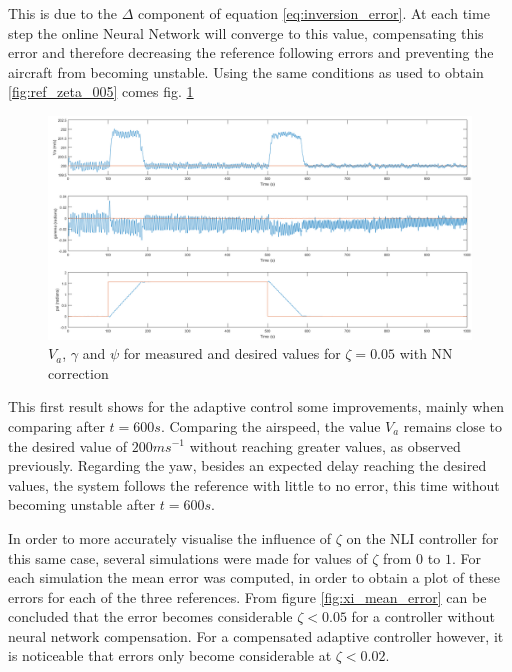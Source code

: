This is due to the $\Delta$ component of equation \ref{eq:inversion_error}. At each time step the online Neural Network will converge to this value, compensating this error and therefore decreasing the reference following errors and preventing the aircraft from becoming unstable. Using the same conditions as used to obtain \ref{fig:ref_zeta_005} comes fig. \ref{fig:ref_zeta_005_NN}

\begin{figure}[H]
\centering
\includegraphics[width=1.1\textwidth]{Figures/Results/ref_zeta_005_NN.png}
\caption[Reference tracking for $\zeta=0.05$ with NN correction]{$V_a$, $\gamma$ and $\psi$ for measured and desired values for $\zeta=0.05$ with NN correction}
\label{fig:ref_zeta_005_NN}
\end{figure}

This first result shows for the adaptive control some improvements, mainly when comparing after $t=600s$. Comparing the airspeed, the value $V_a$ remains close to the desired value of $200ms^{-1}$ without reaching greater values, as observed previously. Regarding the yaw, besides an expected delay reaching the desired values, the system follows the reference with little to no error, this time without becoming unstable after $t=600s$. 

In order to more accurately visualise the influence of $\zeta$ on the NLI controller for this same case, several simulations were made for values of $\zeta$ from $0$ to $1$. For each simulation the mean error was computed, in order to obtain a plot of these errors for each of the three references. From figure  \ref{fig:xi_mean_error} can be concluded that the error becomes considerable $\zeta<0.05$ for a controller without neural network compensation. For a compensated adaptive controller however, it is noticeable that errors only become considerable at $\zeta<0.02$.


